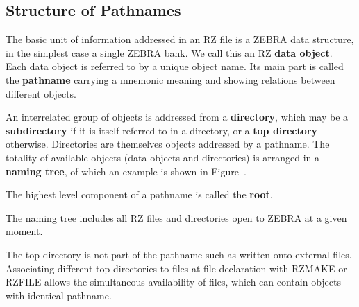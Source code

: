 \subsection{Structure of Pathnames}
\par The basic unit of information addressed in an RZ file
is a ZEBRA data structure, in the simplest case a single ZEBRA bank.
We call this an RZ
{\bf data object}.
Each data object is referred to by
a unique object name. Its main part is called the
{\bf pathname}
carrying a mnemonic meaning and showing relations
between different objects.
\par An interrelated group of objects is addressed from a
{\bf directory}, which may be a {\bf subdirectory}
if it is itself referred to in a directory,
or a {\bf top directory}
otherwise. Directories are themselves objects addressed by a pathname.
The totality of available objects (data objects and directories)
is arranged in a {\bf naming tree},
of which an example is shown in Figure~\pageref{NAMTREE}.
\par The highest level component of a pathname is called the
{\bf root}.
\begin{figure}\label{NAMTREE FRAME=RULE>
\caption{An example of an RZ naming tree}
\begin{verbatim}
     +DDDDD+                         +KKKKK+
     |     |  Directory              |     |  Key
     |     |  entry                  |     |  Entry
     +DDDDD+                         +KKKKK+
 
 ROOT                            //
                                  |
                   +-----------------------------+
                   |              |              |
 TOP            +DDDD+          +DDDD+         +DDDD+
 Directories    | F1 |          | F2 |         | F3 |
                +DDDD+          +DDDD+         +DDDD+
                                  |
                    +---------------------------+
                    |             |             |
                 +DDDD+         +DDDD+        +KKKK+
                 | D1 |         | D2 |        | K1 |
                 +DDDD+         +DDDD+        +KKKK+
 Directories                      |
 and                +---------------------------+
 Key Entries        |             |             |
                 +KKKK+         +DDDD+        +KKKK+
                 | K2 |         | D3 |        | K3 |
                 +KKKK+         +DDDD+        +KKKK+
                                  |
                        +-------------------+
                        |                   |
                      +KKKK+              +KKKK+
                      | K4 |              | K5 |
                      +KKKK+              +KKKK+
\end{verbatim}
\end{figure}
\par The naming tree includes all RZ files and directories open to ZEBRA at
a given moment.
\par The top directory is not part of the pathname such as written onto
external files. Associating different top directories to files at
file declaration with RZMAKE or RZFILE
allows the simultaneous availability of files,
which can contain objects with identical pathname.
